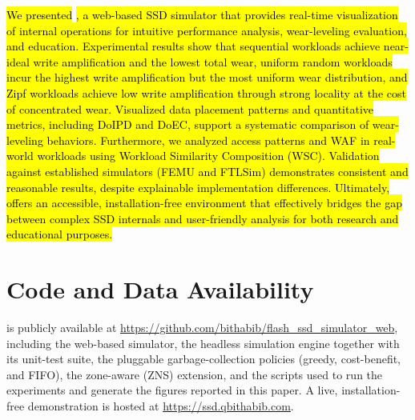 \documentclass{ieeeaccess}
\begin{document}
\hl{We presented} \eyanassdsim\hl{, a web-based SSD simulator that provides real-time visualization of internal operations for intuitive performance analysis, wear-leveling evaluation, and education. Experimental results show that sequential workloads achieve near-ideal write amplification and the lowest total wear, uniform random workloads incur the highest write amplification but the most uniform wear distribution, and Zipf workloads achieve low write amplification through strong locality at the cost of concentrated wear. Visualized data placement patterns and quantitative metrics, including DoIPD and DoEC, support a systematic comparison of wear-leveling behaviors. Furthermore, we analyzed access patterns and WAF in real-world workloads using Workload Similarity Composition (WSC). Validation against established simulators (FEMU and FTLSim) demonstrates consistent and reasonable results, despite explainable implementation differences. Ultimately,} \eyanassdsim \hl{offers an accessible, installation-free environment that effectively bridges the gap between complex SSD internals and user-friendly analysis for both research and educational purposes.}

\section*{Code and Data Availability}
\eyanassdsim is publicly available at \url{https://github.com/bithabib/flash_ssd_simulator_web}, including the web-based simulator, the headless simulation engine together with its unit-test suite, the pluggable garbage-collection policies (greedy, cost-benefit, and FIFO), the zone-aware (ZNS) extension, and the scripts used to run the experiments and generate the figures reported in this paper. A live, installation-free demonstration is hosted at \url{https://ssd.qbithabib.com}.

\end{document}
